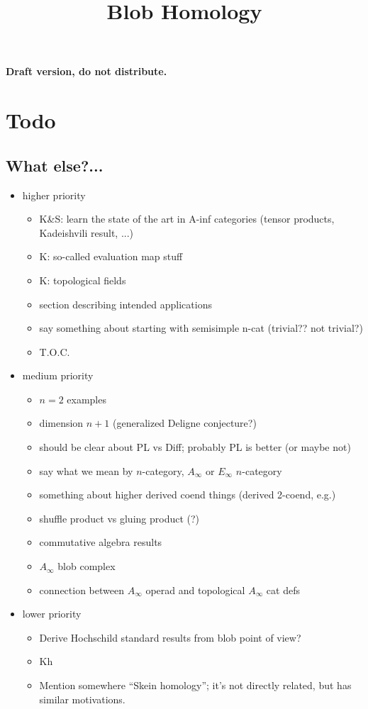 \documentclass[11pt,leqno]{amsart}
\title{Blob Homology}
\begin{document}
\makeatletter
{}
\gdef\theequation{\thesection.\arabic{equation}}
\makeatother


\maketitle

\textbf{Draft version, do not distribute.}

\versioninfo

\section*{Todo}

\subsection*{What else?...}

\begin{itemize}
\item higher priority
\begin{itemize}
\item K\&S: learn the state of the art in A-inf categories
(tensor products, Kadeishvili result, ...)
\item K: so-called evaluation map stuff
\item K: topological fields
\item section describing intended applications
\item say something about starting with semisimple n-cat (trivial?? not trivial?)
\item T.O.C.
\end{itemize}
\item medium priority
\begin{itemize}
\item $n=2$ examples
\item dimension $n+1$ (generalized Deligne conjecture?)
\item should be clear about PL vs Diff; probably PL is better
(or maybe not)
\item say what we mean by $n$-category, $A_\infty$ or $E_\infty$ $n$-category
\item something about higher derived coend things (derived 2-coend, e.g.)
\item shuffle product vs gluing product (?)
\item commutative algebra results
\item $A_\infty$ blob complex
\item connection between $A_\infty$ operad and topological $A_\infty$ cat defs
\end{itemize}
\item lower priority
\begin{itemize}
\item Derive Hochschild standard results from blob point of view?
\item Kh
\item Mention somewhere \cite{MR1624157} ``Skein homology''; it's not directly related, but has similar motivations.
\end{itemize}
\end{itemize}
\end{document}
